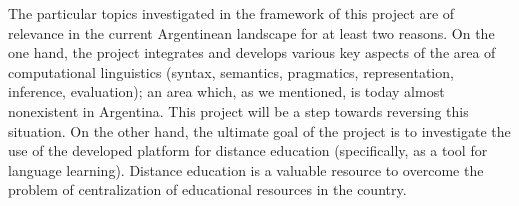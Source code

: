 The particular topics investigated in the framework of this project are of
relevance in the current Argentinean landscape for at least two reasons.
On the one hand, the project integrates and develops various key aspects of the
area of computational linguistics (syntax, semantics, pragmatics,
representation, inference, evaluation); an area which, as we mentioned, is today almost 
nonexistent in Argentina. This project will be a step towards reversing this situation. 
On the other hand, the ultimate goal of the project is to investigate
the use of the developed platform for distance education (specifically, as a tool for
language learning). Distance education is a valuable resource to overcome the problem of
centralization of educational resources in the country. 
